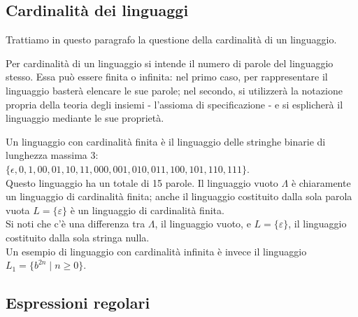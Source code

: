 \documentclass{article}
\begin{document}
\subsection{Cardinalità dei linguaggi}
Trattiamo in questo paragrafo la questione della cardinalità di un linguaggio.
\begin{definition} %
Per cardinalità di un linguaggio si intende il numero di parole del linguaggio stesso. Essa può essere finita o infinita: nel primo caso, per rappresentare il linguaggio basterà elencare le sue parole; nel secondo, si utilizzerà la notazione propria della teoria degli insiemi - l'assioma di specificazione - e si esplicherà il linguaggio mediante le sue proprietà.
\end{definition}
\begin{example}
Un linguaggio con cardinalità finita è il linguaggio delle stringhe binarie di lunghezza massima 3:\\ $\{ \epsilon, 0, 1, 00, 01, 10, 11, 000, 001, 010, 011, 100, 101, 110, 111 \}$. \\Questo linguaggio ha un totale di 15 parole.
Il linguaggio vuoto \( \Lambda \) è chiaramente un linguaggio di cardinalità finita; anche il linguaggio costituito dalla sola parola vuota \( L = \{\varepsilon\} \) è un linguaggio di cardinalità finita.\\\noindent Si noti che c'è una differenza tra \( \Lambda \), il linguaggio vuoto, e \( L = \{\varepsilon\} \), il linguaggio costituito dalla sola stringa nulla.
\\\noindent
Un esempio di linguaggio con cardinalità infinita è invece il linguaggio \( L_1 = \{b^{2n} \mid n \geq 0\} \).
\end{example}
\subsection{Espressioni regolari}
\end{document}
